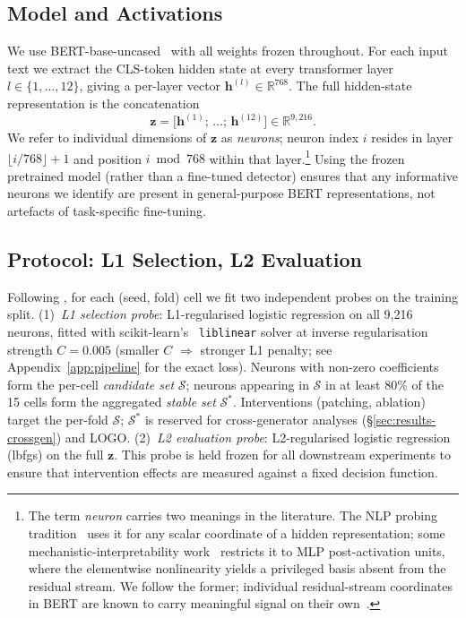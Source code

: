 \documentclass[11pt]{article}
\newcommand{\bertbase}{BERT-base-uncased\xspace}
\begin{document}
\subsection{Model and Activations}
\label{sec:setup-model}

We use \bertbase~\citep{devlin2019bert} with all weights frozen throughout. For each input text we extract the CLS-token hidden state at every transformer layer $l \in \{1, \ldots, 12\}$, giving a per-layer vector $\mathbf{h}^{(l)} \in \mathbb{R}^{768}$. The full hidden-state representation is the concatenation
\[
  \mathbf{z} = \bigl[\mathbf{h}^{(1)};\, \ldots;\, \mathbf{h}^{(12)}\bigr] \in \mathbb{R}^{9{,}216}.
\]
We refer to individual dimensions of $\mathbf{z}$ as \textit{neurons}; neuron index $i$ resides in layer $\lfloor i / 768 \rfloor + 1$ and position $i \bmod 768$ within that layer.\footnote{The term \textit{neuron} carries two meanings in the literature. The NLP probing tradition~\citep{dalvi2019grain,sajjad2022survey,durrani2023salient} uses it for any scalar coordinate of a hidden representation; some mechanistic-interpretability work~\citep{elhage2021framework,gurnee2023haystack} restricts it to MLP post-activation units, where the elementwise nonlinearity yields a privileged basis absent from the residual stream. We follow the former; individual residual-stream coordinates in BERT are known to carry meaningful signal on their own~\citep{kovaleva2021bertbusters,timkey2021rogue}.} Using the frozen pretrained model (rather than a fine-tuned detector) ensures that any informative neurons we identify are present in general-purpose BERT representations, not artefacts of task-specific fine-tuning.

\subsection{Protocol: L1 Selection, L2 Evaluation}
\label{sec:setup-protocol}

Following \citet{gurnee2023haystack}, for each (seed, fold) cell we fit two independent probes on the training split. (1)~\textit{L1 selection probe}: L1-regularised logistic regression on all 9{,}216 neurons, fitted with scikit-learn's~\citep{scikit-learn} \texttt{liblinear} solver at inverse regularisation strength $C = 0.005$ (smaller $C$ $\Rightarrow$ stronger L1 penalty; see Appendix~\ref{app:pipeline} for the exact loss). Neurons with non-zero coefficients form the per-cell \textit{candidate set} $\mathcal{S}$; neurons appearing in $\mathcal{S}$ in at least 80\% of the 15 cells form the aggregated \textit{stable set} $\mathcal{S}^{*}$. Interventions (patching, ablation) target the per-fold $\mathcal{S}$; $\mathcal{S}^{*}$ is reserved for cross-generator analyses (§\ref{sec:results-crossgen}) and LOGO. (2)~\textit{L2 evaluation probe}: L2-regularised logistic regression (lbfgs) on the full $\mathbf{z}$. This probe is held frozen for all downstream experiments to ensure that intervention effects are measured against a fixed decision function.
\end{document}

